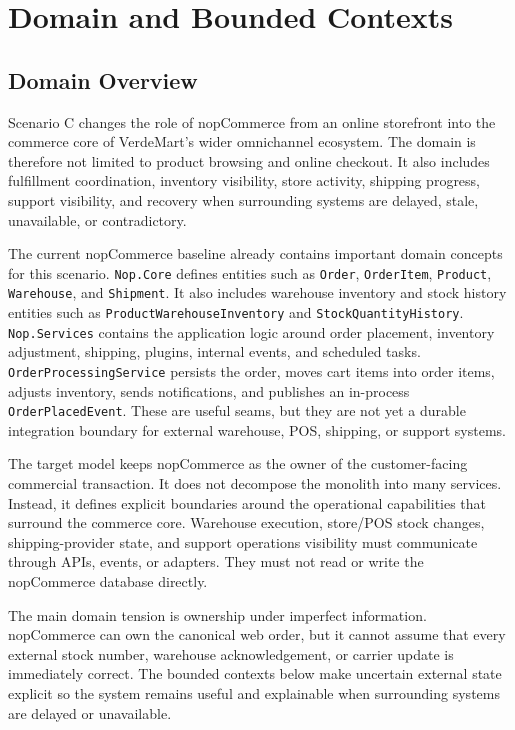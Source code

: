 \chapter{Domain and Bounded Contexts}

\section{Domain Overview}

Scenario C changes the role of nopCommerce from an online storefront into the commerce core
of VerdeMart's wider omnichannel ecosystem. The domain is therefore not limited to product
browsing and online checkout. It also includes fulfillment coordination, inventory visibility,
store activity, shipping progress, support visibility, and recovery when surrounding systems are
delayed, stale, unavailable, or contradictory.

The current nopCommerce baseline already contains important domain concepts for this scenario.
\texttt{Nop.Core} defines entities such as \texttt{Order}, \texttt{OrderItem},
\texttt{Product}, \texttt{Warehouse}, and \texttt{Shipment}. It also includes warehouse
inventory and stock history entities such as \texttt{ProductWarehouse\allowbreak Inventory}
and \texttt{StockQuantity\allowbreak History}. \texttt{Nop.Services} contains the application
logic around order placement, inventory adjustment, shipping, plugins, internal events, and
scheduled tasks. \texttt{OrderProcessingService} persists the order, moves cart items into
order items, adjusts inventory, sends notifications, and publishes an in-process
\texttt{OrderPlacedEvent}. These are useful seams, but they are not yet a durable integration
boundary for external warehouse, POS, shipping, or support systems.

The target model keeps nopCommerce as the owner of the customer-facing commercial
transaction. It does not decompose the monolith into many services. Instead, it defines
explicit boundaries around the operational capabilities that surround the commerce core.
Warehouse execution, store/POS stock changes, shipping-provider state, and support operations
visibility must communicate through APIs, events, or adapters. They must not read or write the
nopCommerce database directly.

The main domain tension is ownership under imperfect information. nopCommerce can own the
canonical web order, but it cannot assume that every external stock number, warehouse
acknowledgement, or carrier update is immediately correct. The bounded contexts below make
uncertain external state explicit so the system remains useful and explainable when surrounding
systems are delayed or unavailable.

